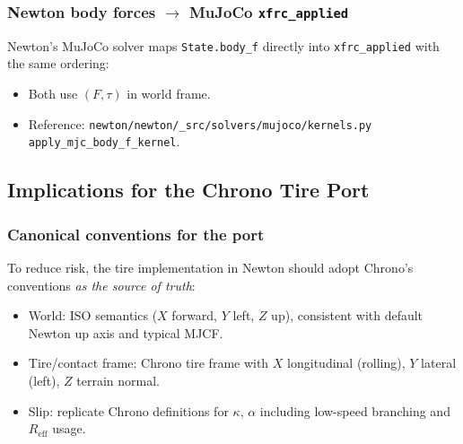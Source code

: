 \subsubsection{Newton body forces $\rightarrow$ MuJoCo \texttt{xfrc\_applied}}
Newton's MuJoCo solver maps \texttt{State.body\_f} directly into \texttt{xfrc\_applied} with the same ordering:
\begin{itemize}
  \item Both use $(F,\tau)$ in world frame.
  \item Reference: \texttt{newton/newton/\_src/solvers/mujoco/kernels.py} \texttt{apply\_mjc\_body\_f\_kernel}.
\end{itemize}

\subsection{Implications for the Chrono Tire Port}

\subsubsection{Canonical conventions for the port}
To reduce risk, the tire implementation in Newton should adopt Chrono's conventions \emph{as the source of truth}:
\begin{itemize}
  \item World: ISO semantics ($X$ forward, $Y$ left, $Z$ up), consistent with default Newton up axis and typical MJCF.
  \item Tire/contact frame: Chrono tire frame with $X$ longitudinal (rolling), $Y$ lateral (left), $Z$ terrain normal.
  \item Slip: replicate Chrono definitions for $\kappa$, $\alpha$ including low-speed branching and $R_{\mathrm{eff}}$ usage.
\end{itemize}

